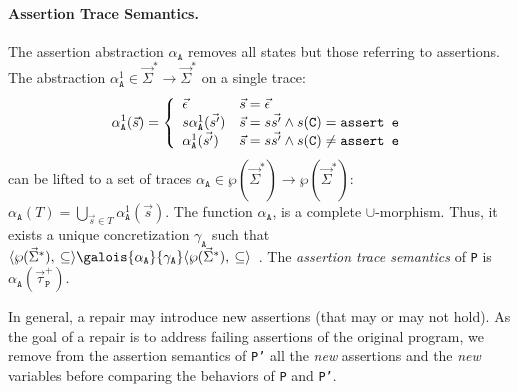 \documentclass[10pt]{sigplanconf}
\newcommand{\code}[1]{\texttt{#1}}
\newcommand{\ltuple}[1]{\langle#1,\allowbreak}
\newcommand{\rtuple}[1]{\:#1\rangle}
\newcommand{\pair}[2]{\ltuple{#1}\rtuple{#2}}
\newcommand{\diff}[2]{\delta_{\code{#1}, \code{#2}}}
\newcommand{\emptytrace}{\vec{\epsilon}}
\begin{document}
\paragraph{Assertion Trace Semantics.}
The assertion abstraction $\alpha_\code{A}$ removes all states but those referring to assertions.
The abstraction $\alpha^1_\code{A} \in \vec{\Sigma}^\ast \rightarrow \vec{\Sigma}^\ast$ on a single trace:
\[
\alpha^1_\code{A}(\vec{s}) = \left\{
\begin{array}{l l}
  \emptytrace                 & \vec{s} = \emptytrace \\
  s\alpha^1_\code{A}(\vec{s'}) &  \vec{s} = s\vec{s'} \wedge s(\code{C}) = \code{assert e} \\
  \alpha^1_\code{A}(\vec{s'})  & \vec{s} = s\vec{s'} \wedge s(\code{C}) \not= \code{assert e}
\end{array}
\right.
\]
can be lifted to a set of traces $\alpha_\code{A} \in \wp(\vec{\Sigma}^\ast) \rightarrow \wp(\vec{\Sigma}^\ast)$: 
\(
\alpha_\code{A}(T) = \bigcup_{\vec{s} \in T} \alpha^1_\code{A}(\vec{s}).
\)
The function $\alpha_\code{A}$, is a complete $\cup$-morphism.
Thus, it exists a unique concretization $\gamma_\code{A}$ such that $\pair{\wp(\vec{\Sigma}^\ast)}{\subseteq}\galois{{\alpha_\code{A}}}{{\gamma_\code{A}}}\pair{\wp(\vec{\Sigma}^\ast)}{\subseteq}$~\cite{CousotCousot77}.
The \emph{assertion trace semantics} of \code{P} is $\alpha_\code{A}(\vec{\tau}^+_\code{P})$.

In general, a repair may introduce new assertions (that may or may not
hold).  As the goal of a repair is to address failing assertions of
the original program, we remove from the assertion semantics of
\code{P'} all the \emph{new} assertions and the \emph{new} variables
before comparing the behaviors of \code{P} and \code{P'}.

\end{document}
